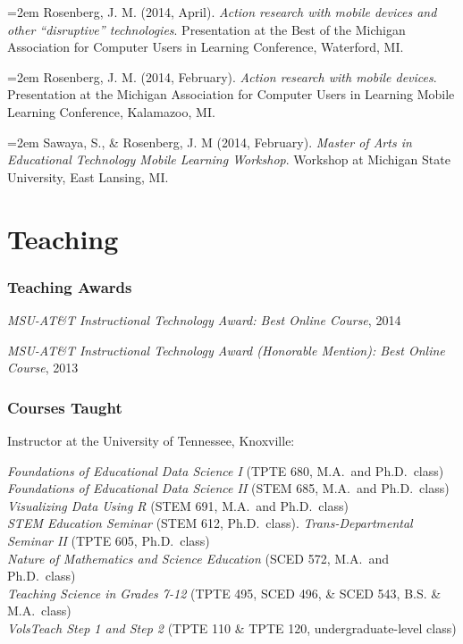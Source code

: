 \documentclass[
  14,
]{article}
\begin{document}
\hangindent=2em Rosenberg, J. M. (2014, April). \emph{Action research
with mobile devices and other ``disruptive'' technologies}. Presentation
at the Best of the Michigan Association for Computer Users in Learning
Conference, Waterford, MI.

\hangindent=2em Rosenberg, J. M. (2014, February). \emph{Action research
with mobile devices}. Presentation at the Michigan Association for
Computer Users in Learning Mobile Learning Conference, Kalamazoo, MI.

\hangindent=2em Sawaya, S., \& Rosenberg, J. M (2014, February).
\emph{Master of Arts in Educational Technology Mobile Learning
Workshop}. Workshop at Michigan State University, East Lansing, MI.

\hypertarget{teaching}{%
\section{Teaching}\label{teaching}}

\hypertarget{teaching-awards}{%
\subsubsection{Teaching Awards}\label{teaching-awards}}

\emph{MSU-AT\&T Instructional Technology Award: Best Online Course},
2014

\emph{MSU-AT\&T Instructional Technology Award (Honorable Mention): Best
Online Course}, 2013

\hypertarget{courses-taught}{%
\subsubsection{Courses Taught}\label{courses-taught}}

Instructor at the University of Tennessee, Knoxville:

\emph{Foundations of Educational Data Science I} (TPTE 680, M.A.~and
Ph.D.~class)\\
\emph{Foundations of Educational Data Science II} (STEM 685, M.A.~and
Ph.D.~class) \emph{Visualizing Data Using R} (STEM 691, M.A.~and
Ph.D.~class)\\
\emph{STEM Education Seminar} (STEM 612, Ph.D.~class).
\emph{Trans-Departmental Seminar II} (TPTE 605, Ph.D.~class)\\
\emph{Nature of Mathematics and Science Education} (SCED 572, M.A.~and
Ph.D.~class)\\
\emph{Teaching Science in Grades 7-12} (TPTE 495, SCED 496, \& SCED 543,
B.S. \& M.A.~class)\\
\emph{VolsTeach Step 1 and Step 2} (TPTE 110 \& TPTE 120,
undergraduate-level class)
\end{document}
